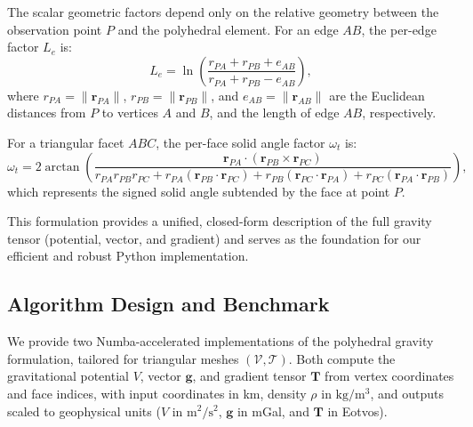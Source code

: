 \documentclass{seg}
\begin{document}
The scalar geometric factors depend only on the relative geometry between the observation point $P$ and the polyhedral element. For an edge $AB$, the per-edge factor $L_e$ is:
\begin{equation}
L_e = \ln \left( \frac{r_{PA} + r_{PB} + e_{AB}}{r_{PA} + r_{PB} - e_{AB}} \right), \tag{6}
\end{equation}
where $r_{PA} = \|\mathbf{r}_{PA}\|$, $r_{PB} = \|\mathbf{r}_{PB}\|$, and $e_{AB} = \|\mathbf{r}_{AB}\|$ are the Euclidean distances from $P$ to vertices $A$ and $B$, and the length of edge $AB$, respectively.

For a triangular facet $ABC$, the per-face solid angle factor $\omega_t$ is:
\begin{equation}
\omega_t = 2 \arctan \left( 
\frac{
\mathbf{r}_{PA} \cdot (\mathbf{r}_{PB} \times \mathbf{r}_{PC})
}{
r_{PA} r_{PB} r_{PC} 
+ r_{PA} (\mathbf{r}_{PB} \cdot \mathbf{r}_{PC}) 
+ r_{PB} (\mathbf{r}_{PC} \cdot \mathbf{r}_{PA}) 
+ r_{PC} (\mathbf{r}_{PA} \cdot \mathbf{r}_{PB})
} \right), \tag{7}
\end{equation}
which represents the signed solid angle subtended by the face at point $P$.

This formulation provides a unified, closed-form description of the full gravity tensor (potential, vector, and gradient) and serves as the foundation for our efficient and robust Python implementation.

\subsection{Algorithm Design and Benchmark}

We provide two Numba-accelerated implementations of the \citet{Werner1996CelestialMechDynAstr} polyhedral gravity formulation, tailored for triangular meshes $(\mathcal{V}, \mathcal{T})$. Both compute the gravitational potential $V$, vector $\mathbf{g}$, and gradient tensor $\mathbf{T}$ from vertex coordinates and face indices, with input coordinates in km, density $\rho$ in $\mathrm{kg/m^3}$, and outputs scaled to geophysical units ($V$ in $\mathrm{m^2/s^2}$, $\mathbf{g}$ in mGal, and $\mathbf{T}$ in Eotvos).
\end{document}
